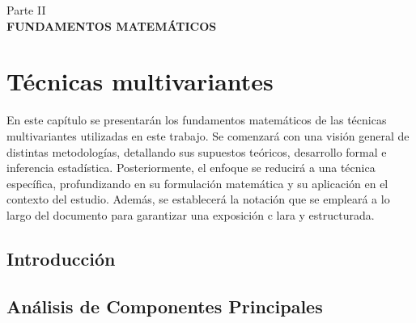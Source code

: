 
\newpage
\thispagestyle{empty}
\vspace*{\fill}
\begin{center}
    \large Parte II \\
    \vspace{0.5cm}           
    \LARGE \textbf{FUNDAMENTOS MATEMÁTICOS}
\end{center}
\vspace*{\fill}
\newpage
\setcounter{page}{1}  

\newpage

\chapter{Técnicas multivariantes}

En este capítulo se presentarán los fundamentos matemáticos de las técnicas multivariantes utilizadas 
en este trabajo. Se comenzará con una visión general de distintas metodologías, detallando sus supuestos 
teóricos, desarrollo formal e inferencia estadística. Posteriormente, el enfoque se reducirá a una 
técnica específica, profundizando en su formulación matemática y su aplicación en el contexto del estudio. 
Además, se establecerá la notación que se empleará a lo largo del documento para garantizar una exposición c
lara y estructurada.

\section{Introducción}

\section{Análisis de Componentes Principales}
\section{}